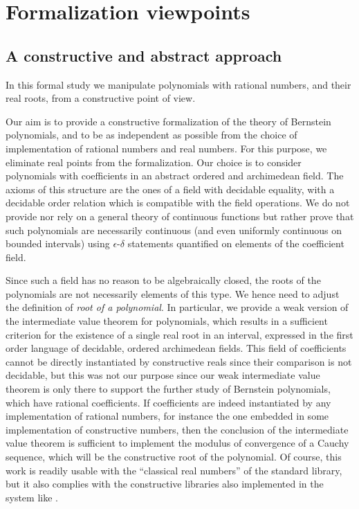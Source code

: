\documentclass{mscs}
\begin{document}
\section{Formalization viewpoints}
\label{sec:rational}

\subsection{A constructive and abstract approach}
In this formal study we manipulate polynomials with rational numbers,
and their real roots, from a constructive point of view.

Our aim is to provide a constructive formalization of the theory of
Bernstein polynomials, and to be as independent as possible from the
choice of implementation of rational numbers and real numbers. For this
purpose, we eliminate real points from the formalization. Our choice
is to consider polynomials with coefficients in an abstract ordered and
archimedean field. The axioms of this structure are the ones of a
field with decidable equality, with a decidable order relation which is
compatible with the field operations. We do not provide
nor rely on a general theory of continuous functions but rather prove
that such polynomials are necessarily continuous (and even uniformly
continuous on bounded intervals) using $\epsilon$-$\delta$ statements
quantified on elements of the coefficient field.

Since such a field has no reason
to be algebraically closed, the roots of the polynomials are not
necessarily elements of this type. We hence need to adjust the
definition of {\em root of a polynomial}. In particular, we provide a
weak version of the intermediate value theorem for polynomials, which
results in a sufficient criterion for the existence of a single real root in
an interval, expressed in the first order language of decidable, ordered
archimedean fields. This field of coefficients cannot be directly
instantiated by constructive reals since their comparison is not
decidable, but this was not our purpose since our weak intermediate
value theorem is only there to support the further study of Bernstein
polynomials, which have rational coefficients. If coefficients are
indeed instantiated by any implementation of
rational numbers, for instance the one embedded in some implementation
of constructive numbers, then the conclusion of the intermediate
value theorem is sufficient to implement the modulus of convergence of
a Cauchy sequence, which will be the constructive root of the
polynomial. Of course, this work is readily usable  with the
``classical real numbers'' of the standard \Coq{} library, but it also
complies with the constructive libraries also implemented in the \Coq{}
system like \cite{DBLP:conf/mkm/Cruz-FilipeGW04, russellreals,
  russellcoqreals}.
\end{document}
